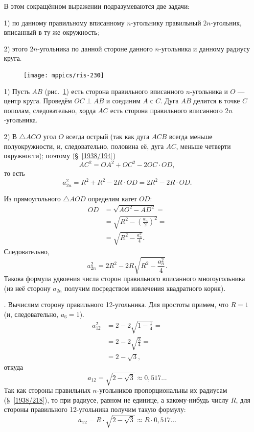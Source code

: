 \documentclass[twoside]{book}
\begin{document}
В этом сокращённом выражении подразумеваются две задачи:

1) по данному правильному вписанному $n$-угольнику  правильный $2n$-угольник, вписанный в ту же окружность;

2)  этого $2n$-угольника по данной стороне данного $n$-угольника и данному радиусу круга.

\begin{figure}
\centering
\texttt{[image: mppics/ris-230]}
\caption{}\label{1938/ris-230}
\end{figure}

1) Пусть $AB$ (рис.~\ref{1938/ris-230}) есть сторона правильного вписанного $n$-угольника и $O$ — центр круга.
Проведём $OC\perp AB$ и соединим $A$ с $C$.
Дуга $AB$ делится в точке $C$ пополам, следовательно, хорда $AC$ есть сторона правильного вписанного $2n$-угольника.

2) В $\triangle ACO$ угол $O$ всегда острый (так как дуга $ACB$ всегда меньше полуокружности, и, следовательно, половина её, дуга $AC$, меньше четверти окружности);
поэтому (§~\ref{1938/194})
\[AC^2=OA^2+OC^2-2OC\cdot OD,\]
то есть
\[a_{2n}^2=R^2+R^2-2R\cdot OD=2R^2-2R\cdot OD.\]

Из прямоугольного $\triangle AOD$ определим катет $OD$:
\begin{align*}
OD&=\sqrt{AO^2-AD^2}=
\\
&=\sqrt{R^2-(\tfrac{a_n}2)^2}=
\\
&=\sqrt{R^2-\tfrac{a_n^2}4}.
\end{align*}
Следовательно,
\[a_{2n}^2=2R^2-2R\sqrt{R^2-\frac{a_n^2}4}.\]
Такова формула удвоения числа сторон правильного вписанного многоугольника (из неё сторону $a_{2n}$ получим посредством извлечения квадратного корня).

\smallskip
{}.
Вычислим сторону правильного 12-угольника.
Для простоты примем, что $R=1$ (и, следовательно, $a_6 = 1$).
\begin{align*}
a_{12}^2&=2-2\sqrt{1-\tfrac14}=
\\
&=2-2\sqrt{\tfrac34}=
\\
&=2-\sqrt{3},
\end{align*}
откуда
\[a_{12}=\sqrt{2-\sqrt3}\approx 0{,}517\dots\]
Так как стороны правильных $n$-угольников пропорциональны их радиусам (§~\ref{1938/218}), то при радиусе, равном не единице, а какому-нибудь числу $R$, для стороны правильного 12-угольника получим такую формулу:
\[a_{12}=R\cdot \sqrt{2-\sqrt3}\approx R\cdot 0{,}517\dots\]
\end{document}
